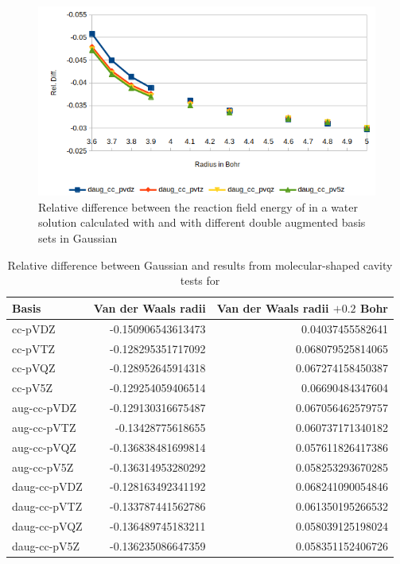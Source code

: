 \documentclass[../master_thesis.tex]{subfiles}
\begin{document}
\begin{figure}[!htb]
  \centering
    \includegraphics[width=\linewidth]{img/cyandaugreldiff.png}
  \caption[Relative difference between  and double augmented Gaussian results]{Relative difference between the reaction field energy of  in a water solution calculated with \mrchem
  and with different double augmented basis sets in Gaussian}
  \label{fig:cyanreldiffdaug}
\end{figure}


\begin{table}[htbp]
\caption[Relative difference between Gaussian and \mrchem results for ]{Relative difference between Gaussian and \mrchem results from molecular-shaped cavity  tests for }
\begin{tabular}{l|r|r}
Basis & \multicolumn{1}{l|}{Van der Waals radii} & \multicolumn{1}{l|}{Van der Waals radii $+ 0.2$ Bohr} \\ \hline
cc-pVDZ & -0.150906543613473 & 0.04037455582641 \\
cc-pVTZ & -0.128295351717092 & 0.068079525814065 \\
cc-pVQZ & -0.128952645914318 & 0.067274158450387 \\
cc-pV5Z & -0.129254059406514 & 0.06690484347604 \\
aug-cc-pVDZ & -0.129130316675487 & 0.067056462579757 \\
aug-cc-pVTZ & -0.13428775618655 & 0.060737171340182 \\
aug-cc-pVQZ & -0.136838481699814 & 0.057611826417386 \\
aug-cc-pV5Z & -0.136314953280292 & 0.058253293670285 \\
daug-cc-pVDZ & -0.128163492341192 & 0.068241090054846 \\
daug-cc-pVTZ & -0.133787441562786 & 0.061350195266532 \\
daug-cc-pVQZ & -0.136489745183211 & 0.058039125198024 \\
daug-cc-pV5Z & -0.136235086647359 & 0.058351152406726 \\
\end{tabular}
\label{tab:watabcreldiff}
\end{table}
\end{document}
